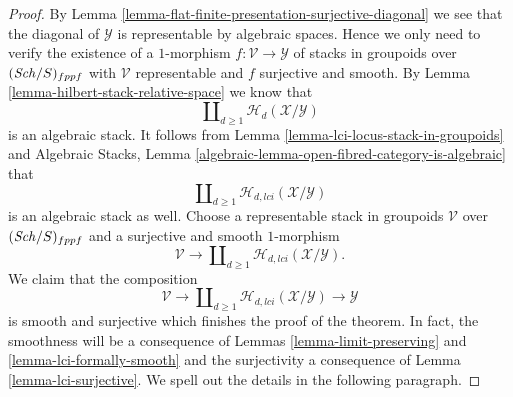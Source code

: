 \begin{proof}
By
Lemma \ref{lemma-flat-finite-presentation-surjective-diagonal}
we see that the diagonal of $\mathcal{Y}$ is representable by algebraic
spaces. Hence we only need to verify the existence of a $1$-morphism
$f : \mathcal{V} \to \mathcal{Y}$ of stacks in groupoids over
$(\mathit{Sch}/S)_{fppf}$ with $\mathcal{V}$ representable and
$f$ surjective and smooth. By
Lemma \ref{lemma-hilbert-stack-relative-space}
we know that
$$
\coprod\nolimits_{d \geq 1} \mathcal{H}_d(\mathcal{X}/\mathcal{Y})
$$
is an algebraic stack. It follows from
Lemma \ref{lemma-lci-locus-stack-in-groupoids}
and
Algebraic Stacks,
Lemma \ref{algebraic-lemma-open-fibred-category-is-algebraic}
that
$$
\coprod\nolimits_{d \geq 1} \mathcal{H}_{d, lci}(\mathcal{X}/\mathcal{Y})
$$
is an algebraic stack as well. Choose a representable stack in groupoids
$\mathcal{V}$ over $(\mathit{Sch}/S)_{fppf}$ and a surjective and smooth
$1$-morphism
$$
\mathcal{V}
\longrightarrow
\coprod\nolimits_{d \geq 1} \mathcal{H}_{d, lci}(\mathcal{X}/\mathcal{Y}).
$$
We claim that the composition
$$
\mathcal{V}
\longrightarrow
\coprod\nolimits_{d \geq 1} \mathcal{H}_{d, lci}(\mathcal{X}/\mathcal{Y})
\longrightarrow
\mathcal{Y}
$$
is smooth and surjective which finishes the proof of the theorem. In fact,
the smoothness will be a consequence of
Lemmas \ref{lemma-limit-preserving} and \ref{lemma-lci-formally-smooth}
and the surjectivity a consequence of
Lemma \ref{lemma-lci-surjective}.
We spell out the details in the following paragraph.


\end{proof}
